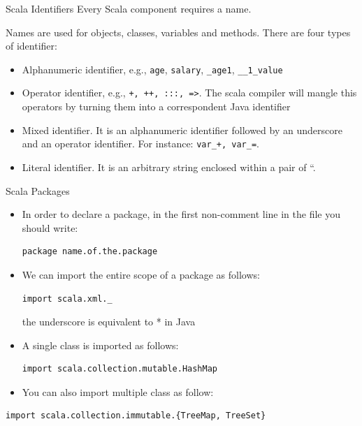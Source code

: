 \documentclass[presentation, aspectratio=169]{beamer}
\begin{document}
\begin{frame}[label={sec:orga4813bd},fragile]{Scala Identifiers}
 Every Scala component requires a name. 

Names are used for objects, classes, variables and methods.
There are four types of identifier:
\begin{itemize}
\item Alphanumeric identifier, e.g., \texttt{age}, \texttt{salary}, \texttt{\_age1}, \texttt{\_\_1\_value}
\item Operator identifier, e.g., \texttt{+, ++, :::, =>}. The scala compiler will mangle this operators 
by turning them into a correspondent Java identifier
\item Mixed identifier. It is an alphanumeric identifier followed by an underscore and an operator identifier.
For instance: \texttt{var\_+, var\_=}.
\item Literal identifier. It is an arbitrary string enclosed within a pair of ``.
\end{itemize}
\end{frame}

\begin{frame}[label={sec:org95a70b3},fragile]{Scala Packages}
 \begin{itemize}
\item In order to declare a package, in the first non-comment line in the file you should write:
\begin{verbatim}
package name.of.the.package
\end{verbatim}

\item We can import the entire scope of a package as follows:
\begin{verbatim}
import scala.xml._
\end{verbatim}
the underscore is equivalent to * in Java

\item A single class is imported as follows:
\begin{verbatim}
import scala.collection.mutable.HashMap
\end{verbatim}

\item You can also import multiple class as follow:
\end{itemize}
\begin{verbatim}
import scala.collection.immutable.{TreeMap, TreeSet}
\end{verbatim}
\end{frame}
\end{document}
